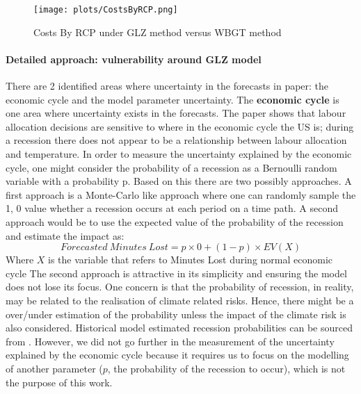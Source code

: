 \documentclass[a4paper,11pt]{extarticle} %
\begin{document}
\begin{figure}[h]
    \centering
    \texttt{[image: plots/CostsByRCP.png]}
    \caption{Costs By RCP under GLZ method versus WBGT method}
    \label{fig:CostsByRCP}
\end{figure}



\paragraph{Detailed approach: vulnerability around GLZ model}

There are 2 identified areas where uncertainty in the forecasts in \cite{TemperatureAndWork:2021} paper: the economic cycle and the model parameter uncertainty.
\newline
The \textbf{economic cycle} is one area where uncertainty exists in the forecasts. 
The paper shows that labour allocation decisions are sensitive to where in the economic cycle the US is; during a recession there does not appear to be a relationship between labour allocation and temperature. In order to measure the uncertainty explained by the economic cycle, one might consider the probability of a recession as a Bernoulli random variable with a probability p. Based on this there are two possibly approaches. A first approach is a Monte-Carlo like approach where one can randomly sample the 1, 0 value whether a recession occurs at each period on a time path. A second approach would be to use the expected value of the probability of the recession and estimate the impact as: 
\begin{equation}
    \label{Eq:economiccycle}
    	Forecasted \ Minutes \ Lost = p \times 0 + (1-p) \times EV(X)
\end{equation}
Where $X$ is the variable that refers to Minutes Lost during normal economic cycle
The second approach is attractive in its simplicity and ensuring the model does not lose its focus. 
One concern is that the probability of recession, in reality, may be related to the realisation of climate related risks. Hence, there might be a over/under estimation of the probability unless the impact of the climate risk is also considered. Historical model estimated recession probabilities can be sourced from \cite{SmoothedU.S.RecessionProbabilities:2022}. However, we did not go further in the measurement of the uncertainty explained by the economic cycle because it requires us to focus on the modelling of another parameter ($p$, the probability of the recession to occur), which is not the purpose of this work. 
\end{document}
